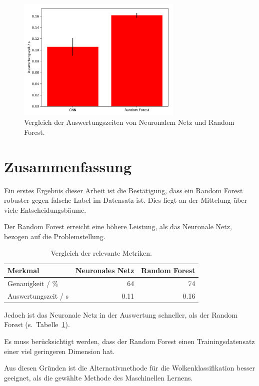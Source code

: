 \begin{figure}
\centering
\includegraphics[width=0.7\textwidth]{content/time.pdf}
\caption{Vergleich der Auswertungszeiten von Neuronalem Netz und Random
Forest.}%
\label{fig:times}
\end{figure}

\hypertarget{zusammenfassung}{%
\section{Zusammenfassung}\label{zusammenfassung}}

Ein erstes Ergebnis dieser Arbeit ist die Bestätigung, dass ein Random
Forest robuster gegen falsche Label im Datensatz ist. Dies liegt an der
Mittelung über viele Entscheidungsbäume.

Der Random Forest erreicht eine höhere Leistung, als das Neuronale Netz,
bezogen auf die Problemstellung.

\begin{table}
  \centering
  \caption{Vergleich der relevante Metriken.}%
  \label{tab:fazit}
  \begin{tabular}[]{@{}lrr@{}}
    \toprule
    Merkmal & Neuronales Netz & Random Forest\\
    \midrule
    Genauigkeit / \% & 64 & 74 \\
    Auswertungszeit / s & 0.11 & 0.16 \\
    \bottomrule
  \end{tabular}
\end{table}

Jedoch ist das Neuronale Netz in der Auswertung schneller, als der
Random Forest (s.~Tabelle~\ref{tab:fazit}).

Es muss berücksichtigt werden, dass der Random Forest einen
Trainingsdatensatz einer viel geringeren Dimension hat.

Aus diesen Gründen ist die Alternativmethode für die
Wolkenklassifikation besser geeignet, als die gewählte Methode des
Maschinellen Lernens.

